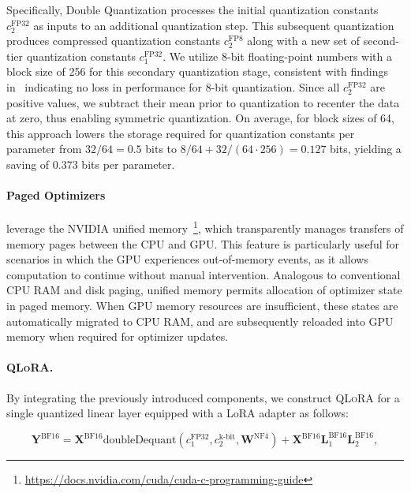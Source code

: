 Specifically, Double Quantization processes the initial quantization constants $c_2^{\text{FP32}}$ as inputs to an additional quantization step. This subsequent quantization produces compressed quantization constants $c_2^{\text{FP8}}$ along with a new set of second-tier quantization constants $c_1^{\text{FP32}}$. We utilize 8-bit floating-point numbers with a block size of 256 for this secondary quantization stage, consistent with findings in~\citet{dettmers2022case} indicating no loss in performance for 8-bit quantization. Since all $c_2^{\text{FP32}}$ are positive values, we subtract their mean prior to quantization to recenter the data at zero, thus enabling symmetric quantization. On average, for block sizes of 64, this approach lowers the storage required for quantization constants per parameter from $32/64=0.5$ bits to $8/64 + 32/(64\cdot256) = 0.127$ bits, yielding a saving of 0.373 bits per parameter.

\paragraph{Paged Optimizers} leverage the NVIDIA unified memory~\footnote{\tiny \url{https://docs.nvidia.com/cuda/cuda-c-programming-guide}}, which transparently manages transfers of memory pages between the CPU and GPU. This feature is particularly useful for scenarios in which the GPU experiences out-of-memory events, as it allows computation to continue without manual intervention. Analogous to conventional CPU RAM and disk paging, unified memory permits allocation of optimizer state in paged memory. When GPU memory resources are insufficient, these states are automatically migrated to CPU RAM, and are subsequently reloaded into GPU memory when required for optimizer updates.

\paragraph{\textsc{QLoRA}.} By integrating the previously introduced components, we construct \textsc{QLoRA} for a single quantized linear layer equipped with a LoRA adapter as follows:

\begin{equation}
    \mathbf{Y}^{\text{BF16}} =  \mathbf{X}^{\text{BF16}} \text{doubleDequant}(c_1^{\text{FP32}}, c_2^{\text{k-bit}}, \mathbf{W}^{\text{NF4}}) + \mathbf{X}^{\text{BF16}}\mathbf{L}^{\text{BF16}}_1\mathbf{L}^{\text{BF16}}_2,
\end{equation}


